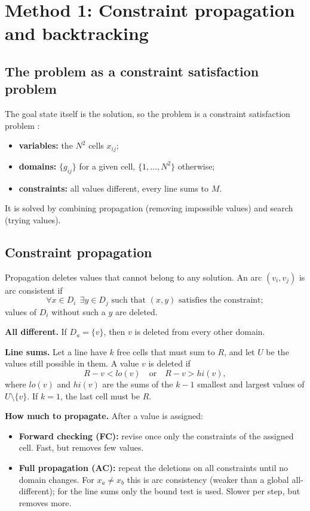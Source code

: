 \documentclass[11pt,a4paper]{article}
\begin{document}
\newpage
\section{Method 1: Constraint propagation and backtracking}
\label{sec:m1}

\subsection{The problem as a constraint satisfaction problem}

The goal state itself is the solution, so the problem is a constraint
satisfaction problem \cite{slides,aima}:
\begin{itemize}[nosep]
  \item \textbf{variables:} the $N^2$ cells $x_{ij}$;
  \item \textbf{domains:} $\{g_{ij}\}$ for a given cell, $\{1,\dots,N^2\}$ otherwise;
  \item \textbf{constraints:} all values different, every line sums to $M$.
\end{itemize}
It is solved by combining propagation (removing impossible values) and
search (trying values).

\subsection{Constraint propagation}

Propagation deletes values that cannot belong to any solution. An arc
$(v_i,v_j)$ is arc consistent if
\[
\forall x\in D_i\ \ \exists y\in D_j \text{ such that } (x,y) \text{ satisfies the constraint};
\]
values of $D_i$ without such a $y$ are deleted.

\textbf{All different.} If $D_a=\{v\}$, then $v$ is deleted from every
other domain.

\textbf{Line sums.} Let a line have $k$ free cells that must sum to $R$,
and let $U$ be the values still possible in them. A value $v$ is deleted if
\[
R-v<lo(v)\quad\text{or}\quad R-v>hi(v),
\]
where $lo(v)$ and $hi(v)$ are the sums of the $k-1$ smallest and largest
values of $U\setminus\{v\}$. If $k=1$, the last cell must be $R$.

\textbf{How much to propagate.} After a value is assigned:
\begin{itemize}[nosep]
  \item \textbf{Forward checking (FC):} revise once only the constraints of
        the assigned cell. Fast, but removes few values.
  \item \textbf{Full propagation (AC):} repeat the deletions on all
        constraints until no domain changes. For $x_a\neq x_b$ this is arc
        consistency (weaker than a global all-different); for the line sums
        only the bound test is used. Slower per step, but removes more.
\end{itemize}
\end{document}
